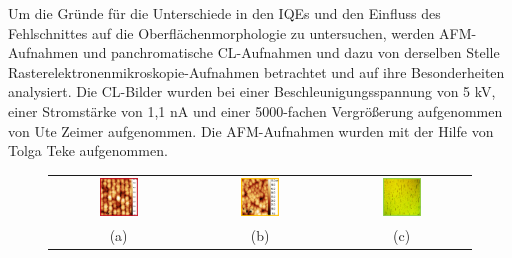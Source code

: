 \noindent 
%
Um die Gründe für die Unterschiede in den IQEs und den Einfluss des Fehlschnittes auf die Oberflächenmorphologie zu untersuchen, werden AFM-Aufnahmen und panchromatische CL-Aufnahmen und dazu von derselben Stelle Rasterelektronenmikroskopie-Aufnahmen betrachtet und auf ihre Besonderheiten analysiert. Die CL-Bilder wurden bei einer Beschleunigungsspannung von 5 kV,
einer Stromstärke von 1,1 nA und einer 5000-fachen Vergrößerung aufgenommen von Ute Zeimer aufgenommen. Die AFM-Aufnahmen wurden mit der Hilfe von Tolga Teke aufgenommen.
%
\begin{figure}
\begin{tabular}{ccc}
  \includegraphics[width=0.30\textwidth]{Bilder/TS4045/aELOafm.png} & \includegraphics[width=0.30\textwidth]{Bilder/TS4045/bELOafm.png}  & \includegraphics[width=0.30\textwidth]{Bilder/TS4045/cELOlimi.png} \\
(a) & (b) & (c) \\[6pt]

\end{tabular}
\end{figure}
